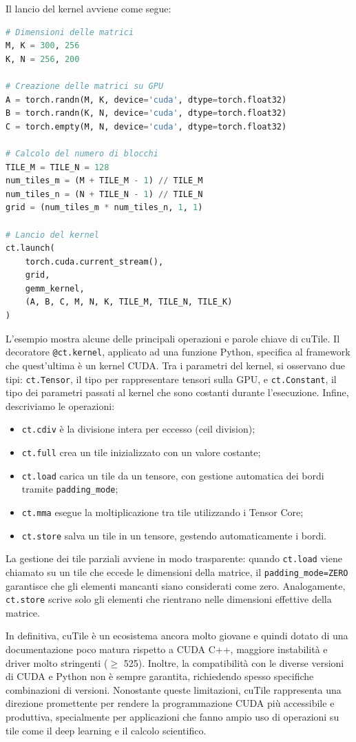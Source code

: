 Il lancio del kernel avviene come segue:
\begin{lstlisting}[language=Python, caption={Lancio del kernel}]
# Dimensioni delle matrici
M, K = 300, 256
K, N = 256, 200

# Creazione delle matrici su GPU
A = torch.randn(M, K, device='cuda', dtype=torch.float32)
B = torch.randn(K, N, device='cuda', dtype=torch.float32)
C = torch.empty(M, N, device='cuda', dtype=torch.float32)

# Calcolo del numero di blocchi
TILE_M = TILE_N = 128
num_tiles_m = (M + TILE_M - 1) // TILE_M
num_tiles_n = (N + TILE_N - 1) // TILE_N
grid = (num_tiles_m * num_tiles_n, 1, 1)

# Lancio del kernel
ct.launch(
    torch.cuda.current_stream(),
    grid,
    gemm_kernel,
    (A, B, C, M, N, K, TILE_M, TILE_N, TILE_K)
)
\end{lstlisting}

L'esempio mostra alcune delle principali operazioni e parole chiave di cuTile.
Il decoratore \texttt{@ct.kernel}, applicato ad una funzione Python, specifica al framework che quest'ultima è un kernel CUDA.
Tra i parametri del kernel, si osservano due tipi: \texttt{ct.Tensor}, il tipo per rappresentare tensori sulla GPU, e \texttt{ct.Constant}, il tipo dei parametri passati al kernel che sono costanti durante l'esecuzione.
Infine, descriviamo le operazioni:
\begin{itemize}
    \item \texttt{ct.cdiv} è la divisione intera per eccesso (ceil division);
    \item \texttt{ct.full} crea un tile inizializzato con un valore costante;
    \item \texttt{ct.load} carica un tile da un tensore, con gestione automatica dei bordi tramite \texttt{padding\_mode};
    \item \texttt{ct.mma} esegue la moltiplicazione tra tile utilizzando i Tensor Core;
    \item \texttt{ct.store} salva un tile in un tensore, gestendo automaticamente i bordi.
\end{itemize}
La gestione dei tile parziali avviene in modo trasparente: quando \texttt{ct.load} viene chiamato su un tile che eccede le dimensioni della matrice, il \texttt{padding\_mode=ZERO} garantisce che gli elementi mancanti siano considerati come zero. Analogamente, \texttt{ct.store} scrive solo gli elementi che rientrano nelle dimensioni effettive della matrice.

\vspace{2mm}
\noindent
In definitiva, cuTile è un ecosistema ancora molto giovane e quindi dotato di una documentazione poco matura rispetto a CUDA C++, maggiore instabilità e driver molto stringenti (\(\geq\) 525). 
Inoltre, la compatibilità con le diverse versioni di CUDA e Python non è sempre garantita, richiedendo spesso specifiche combinazioni di versioni.
Nonostante queste limitazioni, cuTile rappresenta una direzione promettente per rendere la programmazione CUDA più accessibile e produttiva, specialmente per applicazioni che fanno ampio uso di operazioni su tile come il deep learning e il calcolo scientifico.


